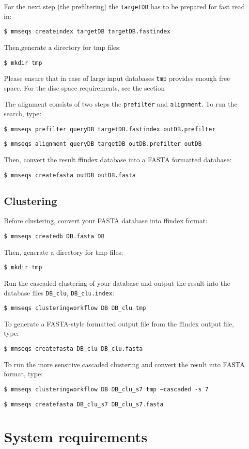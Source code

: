 \documentclass[11pt,a4paper]{report}
\begin{document}
For the next step (the prefiltering) the \texttt{targetDB} has to be prepared for fast read in:

\texttt{\$ mmseqs createindex targetDB targetDB.fastindex}

 Then,generate a directory for tmp files:

\texttt{\$ mkdir tmp}

Please ensure that in case of large input databases \texttt{tmp} provides
enough free space. For the disc space requirements, see the section

The alignment consists of two steps the \texttt{prefilter} and \texttt{alignment}.
To run the search, type:

\texttt{\$ mmseqs prefilter queryDB targetDB.fastindex outDB.prefilter }

\texttt{\$ mmseqs alignment queryDB targetDB outDB.prefilter outDB }

Then, convert the result ffindex database into a FASTA formatted database:

\texttt{\$ mmseqs createfasta outDB outDB.fasta}


\subsection*{Clustering}

Before clustering, convert your FASTA database into ffindex format:

\texttt{\$ mmseqs createdb DB.fasta DB}

Then, generate a directory for tmp files:

\texttt{\$ mkdir tmp}

Run the cascaded clustering of your database and output the result
into the database files \texttt{DB\_clu}, \texttt{DB\_clu.index}:

\texttt{\$ mmseqs clusteringworkflow DB DB\_clu tmp}

To generate a FASTA-style formatted output file from the ffindex output
file, type:

\texttt{\$ mmseqs createfasta DB\_clu DB\_clu.fasta}

To run the more sensitive cascaded clustering and convert the result
into FASTA format, type:

\texttt{\$ mmseqs clusteringworkflow DB DB\_clu\_s7 tmp --cascaded -s 7}

\texttt{\$ mmseqs createfasta DB\_clu\_s7 DB\_clu\_s7.fasta}


\section{System requirements}
\end{document}
